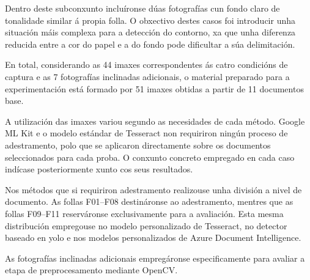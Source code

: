 Dentro deste subconxunto incluíronse dúas fotografías cun fondo claro de tonalidade similar á propia folla. O obxectivo destes casos foi introducir unha situación máis complexa para a detección do contorno, xa que unha diferenza reducida entre a cor do papel e a do fondo pode dificultar a súa delimitación.

En total, considerando as 44 imaxes correspondentes ás catro condicións de captura e as 7 fotografías inclinadas adicionais, o material preparado para a experimentación está formado por 51 imaxes obtidas a partir de 11 documentos base.

A utilización das imaxes variou segundo as necesidades de cada método. Google ML Kit e o modelo estándar de Tesseract non requiriron ningún proceso de adestramento, polo que se aplicaron directamente sobre os documentos seleccionados para cada proba. O conxunto concreto empregado en cada caso indícase posteriormente xunto cos seus resultados.

Nos métodos que si requiriron adestramento realizouse unha división a nivel de documento. As follas F01--F08 destináronse ao adestramento, mentres que as follas F09--F11 reserváronse exclusivamente para a avaliación. Esta mesma distribución empregouse no modelo personalizado de Tesseract, no detector baseado en \gls{yolo} e nos modelos personalizados de Azure Document Intelligence.

As fotografías inclinadas adicionais empregáronse especificamente para avaliar a etapa de preprocesamento mediante OpenCV.


%
%

